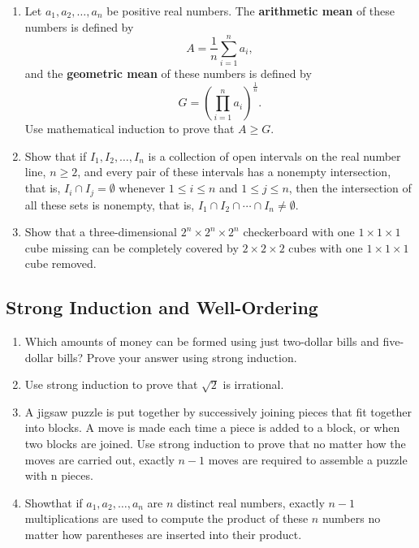 \documentclass{../../cls/sig-alternate-05-2015}
\begin{document}
\begin{enumerate}
\item Let $a_1, a_2, \ldots, a_n$ be positive real numbers.
The \textbf{arithmetic mean} of these numbers is defined by \begin{equation}
    A = \frac{1}{n} \sum_{i = 1}^n a_i,
\end{equation} and the \textbf{geometric mean} of these numbers is defined by \begin{equation}
    G = \left(\prod_{i = 1}^{n} a_i\right)^\frac{1}{n}.
\end{equation}
Use mathematical induction to prove that $A \ge G$.

\item Show that if $I_1, I_2, \ldots, I_n$ is a collection of open intervals on the real number line,
$n \ge 2$,
and every pair of these intervals has a nonempty intersection,
that is,
$I_i \cap I_j = \emptyset$ whenever $1 \le i \le n$ and $1 \le j \le n$,
then the intersection of all these sets is nonempty, that is,
$I_1 \cap I_2 \cap \cdots \cap I_n \ne \emptyset$.

\item Show that a three-dimensional $2^n \times 2^n \times 2^n$ checkerboard with one $1 \times 1 \times 1$ cube missing can be completely covered by $2 \times 2 \times 2$ cubes with one $1 \times 1 \times 1$ cube removed.

\end{enumerate}

\subsection{Strong Induction and Well-Ordering}
\begin{enumerate}
\item Which amounts of money can be formed using just two-dollar bills and five-dollar bills? Prove your answer using strong induction.

\item Use strong induction to prove that $\sqrt{2}$ is irrational.

\item A jigsaw puzzle is put together by successively joining
pieces that fit together into blocks. A move is made each
time a piece is added to a block, or when two blocks
are joined. Use strong induction to prove that no matter
how the moves are carried out, exactly $n - 1$ moves are
required to assemble a puzzle with n pieces.

\item Showthat if $a_1, a_2, \ldots, a_n$ are $n$ distinct real numbers, exactly $n - 1$ multiplications are used to compute the product of these $n$ numbers no matter how parentheses are inserted into their product.

\end{enumerate}
\end{document}

